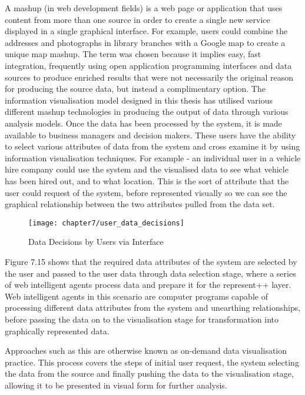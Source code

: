 A mashup (in web development fields) is a web page or application that uses content from more than one source in order to create a single new service displayed in a single graphical interface. For example, users could combine the addresses and photographs in library branches with a Google map to create a unique map mashup. The term was chosen because it implies easy, fast integration, frequently using open application programming interfaces and data sources to produce enriched results that were not necessarily the original reason for producing the source data, but instead a complimentary option. The information visualisation model designed in this thesis has utilised various different mashup technologies in producing the output of data through various analysis models. Once the data has been processed by the system, it is made available to business managers and decision makers. These users have the ability to select various attributes of data from the system and cross examine it by using information visualisation techniques. For example - an individual user in a vehicle hire company could use the system and the visualised data to see what vehicle has been hired out, and to what location. This is the sort of attribute that the user could request of the system, before represented visually so we can see the graphical relationship between the two attributes pulled from the data set.

\begin{figure}[H]
\centering
\texttt{[image: chapter7/user\_data\_decisions]}
\caption{Data Decisions by Users via Interface }
\end{figure}

Figure 7.15 shows that the required data attributes of the system are selected by the user and passed to the user data through data selection stage, where a series of web intelligent agents process data and prepare it for the represent++ layer. Web intelligent agents in this scenario are computer programs capable of processing different data attributes from the system and unearthing relationships, before passing the data on to the visualisation stage for transformation into graphically represented data. 

Approaches such as this are otherwise known as on-demand data visualisation practice. This process covers the steps of initial user request, the system selecting the data from the source and finally pushing the data to the visualisation stage, allowing it to be presented in visual form for further analysis.

